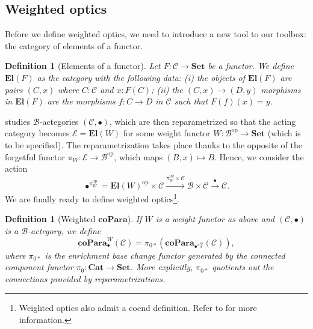 \documentclass[11pt,a4paper,openright,twoside]{report}
\newcounter{mycounter}
\theoremstyle{plain}
\newtheorem{definition}[mycounter]{Definition}
\theoremstyle{definition}
\begin{document}
\subsection{Weighted optics}

Before we define weighted optics, we need to introduce a new tool to our toolbox: the category of elements of a functor.

\begin{definition}[Elements of a functor]
  Let $F: \mathcal{C} \to \mathbf{Set}$ be a functor. We define $\mathbf{El}(F)$ as the category with the following data: (i) the objects of $\mathbf{El}(F)$ are pairs $(C, x)$ where $C : \mathcal{C}$ and $x : F(C)$; (ii) the $(C, x) \to (D, y)$ morphisms in $\mathbf{El}(F)$ are the morphisms $f: C \to D$ in $\mathcal{C}$ such that $F(f)(x) = y$.
\end{definition}

\cite{gavranovic2024fundamental} studies $\mathcal{B}$-actegories $(\mathcal{C}, \bullet)$, which are then reparametrized so that the acting category becomes $\mathcal{E} = \mathbf{El}(W)$ for some weight functor $W: \mathcal{B}^{\mathrm{op}} \to \mathbf{Set}$ (which is to be specified). The reparametrization takes place thanks to the opposite of the forgetful functor $\pi_W: \mathcal{E} \to \mathcal{B}^{\mathrm{op}}$, which maps $(B,x) \mapsto B$. Hence, we consider the action
\[\bullet^{\pi_W^{\mathrm{op}}} = \mathbf{El}(W)^{\mathrm{op}} \times \mathcal{C} \stackrel{\pi_W^{\mathrm{op}} \times \mathcal{C}}{\longrightarrow} \mathcal{B} \times \mathcal{C} \stackrel{\bullet}{\longrightarrow} \mathcal{C}.\]
We are finally ready to define weighted optics\footnote{Weighted optics also admit a coend definition. Refer to \cite{gavranovic2024fundamental} for more information.}.

\begin{definition}[Weighted $\mathbf{coPara}$]
  If $W$ is a weight functor as above and $(\mathcal{C}, \bullet)$ is a $\mathcal{B}$-actegory, we define
  \[\mathbf{coPara}^W_{\bullet}(\mathcal{C}) = \pi_{0*}(\mathbf{coPara}_{\bullet^{\pi_W^{\mathrm{op}}}}(\mathcal{C})),\]
  where $\pi_{0*}$ is the enrichment base change functor generated by the connected component functor $\pi_{0}: \mathbf{Cat} \to \mathbf{Set}$. More explicitly, $\pi_{0*}$ quotients out the connections provided by reparametrizations.
\end{definition}
\end{document}
